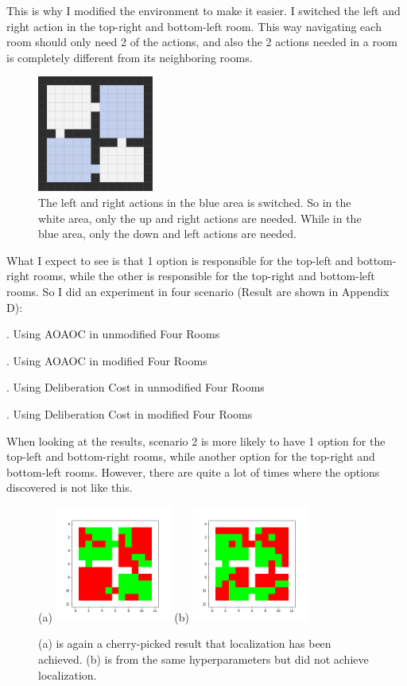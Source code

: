\documentclass{article}
\begin{document}
	\quad This is why I modified the environment to make it easier. I switched the left and right action in the top-right and bottom-left room. This way navigating each room should only need 2 of the actions, and also the 2 actions needed in a room is completely different from its neighboring rooms.
	\begin{figure}[h]
		\centering
		\includegraphics[width=1.5in]{after.png}
		\caption{The left and right actions in the blue area is switched. So in the white area, only the up and right actions are needed. While in the blue area, only the down and left actions are needed.}
	\end{figure}

	\quad What I expect to see is that 1 option is responsible for the top-left and bottom-right rooms, while the other is responsible for the top-right and bottom-left rooms. So I did an experiment in four scenario (Result are shown in Appendix D):
	
	. Using AOAOC in unmodified Four Rooms
	
	. Using AOAOC in modified Four Rooms
	
	. Using Deliberation Cost in unmodified Four Rooms
	
	. Using Deliberation Cost in modified Four Rooms
	
	\quad When looking at the results, scenario 2 is more likely to have 1 option for the top-left and bottom-right rooms, while another option for the top-right and bottom-left rooms. However, there are quite a lot of times where the options discovered is not like this.
	\begin{figure}[h]
		\centering
		\large{(a)}
		\includegraphics[width=1.5in]{goodPicked2.png}
		\hspace{0.2in}
		\large{(b)}
		\includegraphics[width=1.5in]{badPicked2.png}
		\caption{(a) is again a cherry-picked result that localization has been achieved. (b) is from the same hyperparameters but did not achieve localization.}
	\end{figure}
\end{document}
